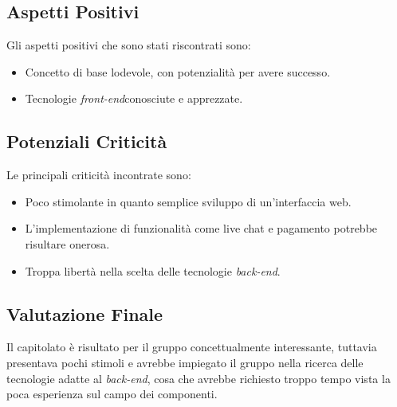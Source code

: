 \subsection{Aspetti Positivi}
	Gli aspetti positivi che sono stati riscontrati sono:
	\begin{itemize}
	\item Concetto di base lodevole, con potenzialità per avere successo.
	\item Tecnologie \textit{front-end}conosciute e apprezzate.
	\end{itemize}

\subsection{Potenziali Criticità}
	Le principali criticità incontrate sono:
	\begin{itemize}
		\item Poco stimolante in quanto semplice sviluppo di un'interfaccia web.
		\item L'implementazione di funzionalità come live chat e pagamento potrebbe risultare onerosa.
		\item Troppa libertà nella scelta delle tecnologie \textit{back-end}.  
	\end{itemize}

\subsection{Valutazione Finale}
	Il capitolato è risultato per il gruppo concettualmente interessante, tuttavia presentava pochi stimoli e avrebbe impiegato il gruppo nella ricerca delle tecnologie adatte al \textit{back-end}, cosa che avrebbe richiesto troppo tempo vista la poca esperienza sul campo dei componenti.